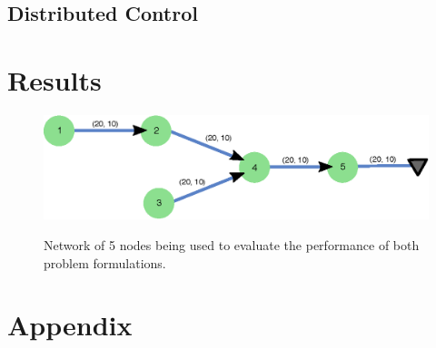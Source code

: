 \documentclass{article}
\begin{document}
\subsection{Distributed Control}

\section{Results}
\begin{figure}[H]
	\includegraphics[width=\textwidth]{network.eps}
	\label{fig1}
	\caption{Network of 5 nodes being used to evaluate the performance of both problem formulations.}
\end{figure}
\section{Appendix}
  
\end{document}
